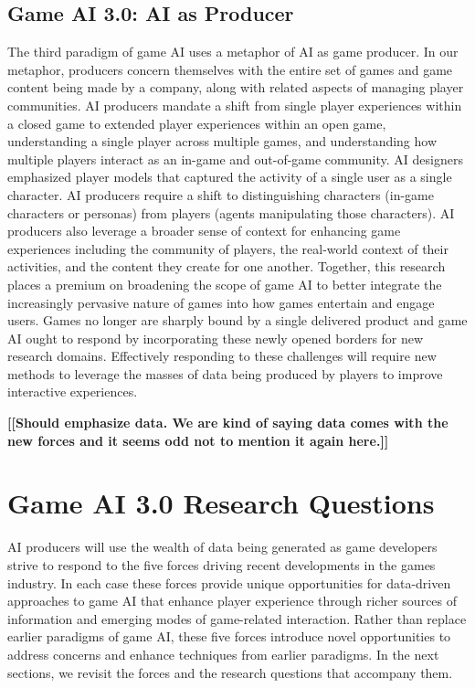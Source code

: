 \documentclass[conference]{IEEEtran}
\newcommand{\mytodo}[1]{\textbf{[[#1]]}}
\begin{document}
\subsection{Game AI 3.0: AI as Producer}

The third paradigm of game AI uses a metaphor of AI as game producer. 
In our metaphor, producers concern themselves with the entire set of games and game content being made by a company, along with related aspects of managing player communities. 
AI producers mandate a shift from single player experiences within a closed game to extended player experiences within an open game, understanding a single player across multiple games, and understanding how multiple players interact as an in-game and out-of-game community. AI designers emphasized player models that captured the activity of a single user as a single character. AI producers require a shift to distinguishing characters (in-game characters or personas) from players (agents manipulating those characters). AI producers also leverage a broader sense of context for enhancing game experiences including the community of players, the real-world context of their activities, and the content they create for one another. Together, this research places a premium on broadening the scope of game AI to better integrate the increasingly pervasive nature of games into how games entertain and engage users. Games no longer are sharply bound by a single delivered product and game AI ought to respond by incorporating these newly opened borders for new research domains. Effectively responding to these challenges will require new methods to leverage the masses of data being produced by players to improve interactive experiences.

\mytodo{Should emphasize data. We are kind of saying data comes with the new forces and it seems odd not to mention it again here.}


\section{Game AI 3.0 Research Questions}

AI producers will use the wealth of data being generated as game developers strive to respond to the five forces driving recent developments in the games industry.
In each case these forces provide unique opportunities for data-driven approaches to game AI that enhance player experience through richer sources of information and emerging modes of game-related interaction. Rather than replace earlier paradigms of game AI, these five forces introduce novel opportunities to address concerns and enhance techniques from earlier paradigms.
%
In the next sections, we revisit the forces and the research questions that accompany them.
\end{document}

